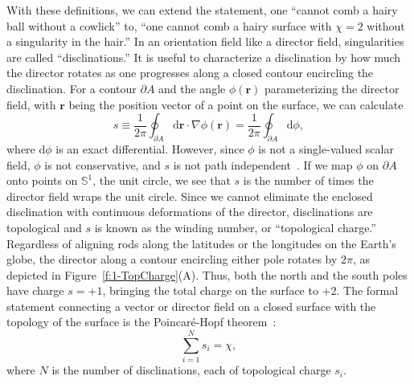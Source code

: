 With these definitions, we can extend the statement, one ``cannot comb a hairy ball without a cowlick'' to, ``one cannot comb a hairy surface with $\chi=2$ without a singularity in the hair.''
In an orientation field like a director field, singularities are called ``disclinations.''
It is useful to characterize a disclination by how much the director rotates as one progresses along a closed contour encircling the disclination.
For a contour $\partial A$ and the angle $\phi(\mathbf{r})$ parameterizing the director field, with $\mathbf{r}$ being the position vector of a point on the surface, we can calculate~\cite{RN23,RN153,RN203}
\begin{equation}
  s \equiv \frac{1}{2 \pi}\oint_{\partial A} \textrm{d}\mathbf{r} \cdot \nabla\phi(\mathbf{r}) = \frac{1}{2\pi} \oint_{\partial A} \textrm{d} \phi,\label{eq:1-topCharge}
\end{equation}
where $\textrm{d}\phi$ is an exact differential.
However, since $\phi$ is not a single-valued scalar field, $\phi$ is not conservative, and $s$ is not path independent~\cite{scalarfield}.
If we map $\phi$ on $\partial A$ onto points on $\mathbb{S}^1$, the unit circle, we see that $s$ is the number of times the director field wraps the unit circle.
Since we cannot eliminate the enclosed disclination with continuous deformations of the director, disclinations are topological and $s$ is known as the winding number, or ``topological charge.''
Regardless of aligning rods along the latitudes or the longitudes on the Earth's globe, the director along a contour encircling either pole rotates by $2 \pi$, as depicted in Figure~\ref{f:1-TopCharge}(A).
Thus, both the north and the south poles have charge $s = +1$, bringing the total charge on the surface to $+2$.
The formal statement connecting a vector or director field on a closed surface with the topology of the surface is the Poincar\'e-Hopf theorem~\cite{RN23}:
\begin{equation}
  \sum\limits_{i = 1}^{N} s_i = \chi,\label{e:1-PH}
\end{equation}
where $N$ is the number of disclinations, each of topological charge $s_i$.

